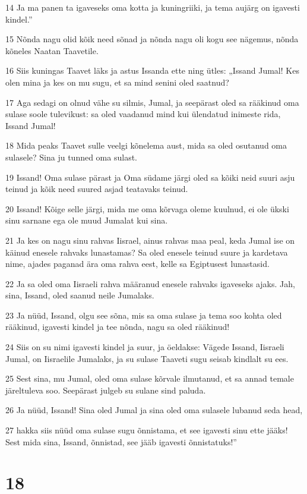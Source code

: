 \par 14 Ja ma panen ta igaveseks oma kotta ja kuningriiki, ja tema aujärg on igavesti kindel.”
\par 15 Nõnda nagu olid kõik need sõnad ja nõnda nagu oli kogu see nägemus, nõnda kõneles Naatan Taavetile.
\par 16 Siis kuningas Taavet läks ja astus Issanda ette ning ütles: „Issand Jumal! Kes olen mina ja kes on mu sugu, et sa mind senini oled saatnud?
\par 17 Aga sedagi on olnud vähe su silmis, Jumal, ja seepärast oled sa rääkinud oma sulase soole tulevikust: sa oled vaadanud mind kui ülendatud inimeste rida, Issand Jumal!
\par 18 Mida peaks Taavet sulle veelgi kõnelema aust, mida sa oled osutanud oma sulasele? Sina ju tunned oma sulast.
\par 19 Issand! Oma sulase pärast ja Oma südame järgi oled sa kõiki neid suuri asju teinud ja kõik need suured asjad teatavaks teinud.
\par 20 Issand! Kõige selle järgi, mida me oma kõrvaga oleme kuulnud, ei ole ükski sinu sarnane ega ole muud Jumalat kui sina.
\par 21 Ja kes on nagu sinu rahvas Iisrael, ainus rahvas maa peal, keda Jumal ise on käinud enesele rahvaks lunastamas? Sa oled enesele teinud suure ja kardetava nime, ajades paganad ära oma rahva eest, kelle sa Egiptusest lunastasid.
\par 22 Ja sa oled oma Iisraeli rahva määranud enesele rahvaks igaveseks ajaks. Jah, sina, Issand, oled saanud neile Jumalaks.
\par 23 Ja nüüd, Issand, olgu see sõna, mis sa oma sulase ja tema soo kohta oled rääkinud, igavesti kindel ja tee nõnda, nagu sa oled rääkinud!
\par 24 Siis on su nimi igavesti kindel ja suur, ja öeldakse: Vägede Issand, Iisraeli Jumal, on Iisraelile Jumalaks, ja su sulase Taaveti sugu seisab kindlalt su ees.
\par 25 Sest sina, mu Jumal, oled oma sulase kõrvale ilmutanud, et sa annad temale järeltuleva soo. Seepärast julgeb su sulane sind paluda.
\par 26 Ja nüüd, Issand! Sina oled Jumal ja sina oled oma sulasele lubanud seda head,
\par 27 hakka siis nüüd oma sulase sugu õnnistama, et see igavesti sinu ette jääks! Sest mida sina, Issand, õnnistad, see jääb igavesti õnnistatuks!”

\chapter{18}

